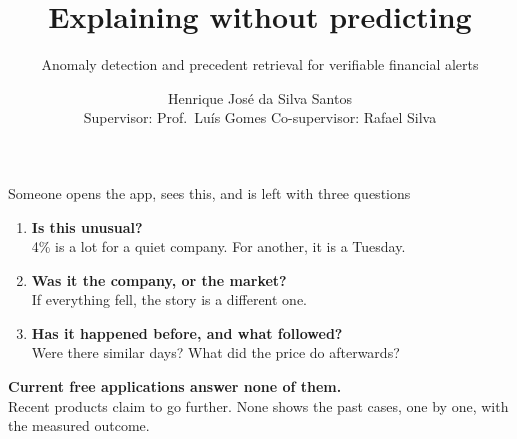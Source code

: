 \documentclass[aspectratio=169]{beamer}
\title[\gator]{Explaining without predicting}
\subtitle{\normalsize Anomaly detection and precedent retrieval for verifiable financial alerts}
\author[H.\ Santos]{Henrique José da Silva Santos \\
  \footnotesize Supervisor: Prof.\ Luís Gomes \quad Co-supervisor: Rafael Silva}
\institute[ISEP]{MEIA, Instituto Superior de Engenharia do Porto}
\date{\footnotesize}
\begin{document}
\begin{frame}\titlepage\end{frame}

\begin{frame}{Someone opens the app, sees this, and is left with three questions}
\begin{center}
\end{center}
\vspace{1mm}
\begin{enumerate}
  \item[\textbf{1.}] \textbf{Is this unusual?}\\
        \footnotesize 4\% is a lot for a quiet company. For another, it is a Tuesday.\\[2mm]
  \item[\textbf{2.}] \textbf{Was it the company, or the market?}\\
        \footnotesize If everything fell, the story is a different one.\\[2mm]
  \item[\textbf{3.}] \textbf{Has it happened before, and what followed?}\\
        \footnotesize Were there similar days? What did the price do afterwards?
\end{enumerate}
\vspace{2mm}
\begin{center}
\textbf{Current free applications answer none of them.}\\[1mm]
\footnotesize Recent products claim to go further. None shows the past cases, one by one,
with the measured outcome.
\end{center}
\end{frame}
\end{document}
